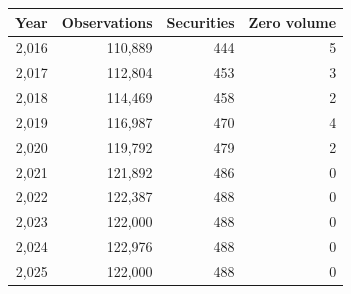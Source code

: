 \begin{tabular}{@{}rrrr@{}}
\toprule
Year & Observations & Securities & Zero volume \\
\midrule
2,016 & 110,889 & 444 & 5 \\
2,017 & 112,804 & 453 & 3 \\
2,018 & 114,469 & 458 & 2 \\
2,019 & 116,987 & 470 & 4 \\
2,020 & 119,792 & 479 & 2 \\
2,021 & 121,892 & 486 & 0 \\
2,022 & 122,387 & 488 & 0 \\
2,023 & 122,000 & 488 & 0 \\
2,024 & 122,976 & 488 & 0 \\
2,025 & 122,000 & 488 & 0 \\
\bottomrule
\end{tabular}

